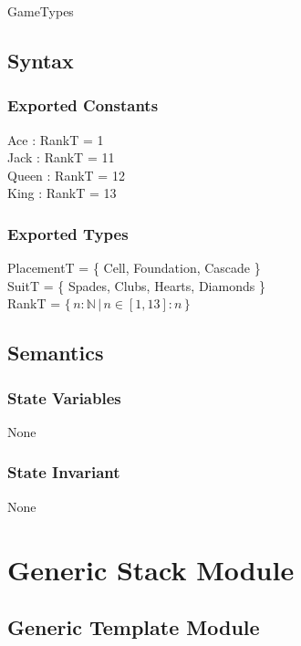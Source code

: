 \documentclass[12pt]{article}
\newcommand{\set}[1]{{\{\, #1 \,\}}}
\begin{document}
GameTypes

\subsection*{Syntax}

\subsubsection*{Exported Constants}

Ace : RankT = 1\\
Jack : RankT = 11\\
Queen : RankT = 12\\
King : RankT = 13\\

\subsubsection*{Exported Types}

PlacementT = \{ Cell, Foundation, Cascade \}\\
SuitT = \{ Spades, Clubs, Hearts, Diamonds \}\\
RankT = $\set{ n : \mathbb{N} \,|\, n \in [1, 13] : n }$\\

\subsection*{Semantics}

\subsubsection*{State Variables}

None

\subsubsection*{State Invariant}

None


\newpage


\section*{Generic Stack Module}

\subsection*{Generic Template Module}
\end{document}
